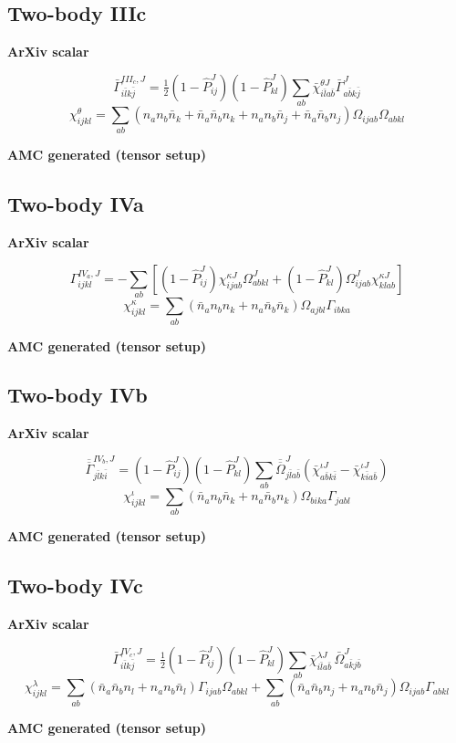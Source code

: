 \documentclass[11pt]{article}
\newcommand{\CompareBlock}[3]{%
\subsection*{#1}
\noindent
\begin{minipage}[t]{0.48\textwidth}
\textbf{ArXiv scalar}
#2
\end{minipage}\hfill
\begin{minipage}[t]{0.48\textwidth}
\textbf{AMC generated (tensor setup)}

\end{minipage}
\vspace{1em}
}
\begin{document}
\CompareBlock{Two-body IIIc}{
\begin{equation*}
\bar\Gamma^{III_c,J}_{i\bar l k\bar j}=\tfrac12(1-\hat P^J_{ij})(1-\hat P^J_{kl})\sum_{ab}\bar\chi^{\theta J}_{i\bar l a\bar b}\bar\Gamma^J_{a\bar b k\bar j}
\end{equation*}
\begin{equation*}
 \chi^{\theta}_{ijkl}=\sum_{ab}\left(n_a n_b\bar n_k+\bar n_a\bar n_b n_k+n_a n_b\bar n_j+\bar n_a\bar n_b n_j\right)\Omega_{ijab}\Omega_{abkl}
\end{equation*}
}{amc_eq_snippets_clean/dc_G3c_tensor_clean_body.tex}

\CompareBlock{Two-body IVa}{
\begin{equation*}
\Gamma^{IV_a,J}_{ijkl}=-\sum_{ab}\left[(1-\hat P^J_{ij})\chi^{\kappa J}_{ijab}\Omega^J_{abkl}+(1-\hat P^J_{kl})\Omega^J_{ijab}\chi^{\kappa J}_{klab}\right]
\end{equation*}
\begin{equation*}
 \chi^{\kappa}_{ijkl}=\sum_{ab}\left(\bar n_a n_b n_k+n_a\bar n_b\bar n_k\right)\Omega_{ajbl}\Gamma_{ibka}
\end{equation*}
}{amc_eq_snippets_clean/dc_G4a_tensor_clean_body.tex}

\CompareBlock{Two-body IVb}{
\begin{equation*}
\overline{\overline\Gamma}^{IV_b,J}_{j\bar l k\bar i}=(1-\hat P^J_{ij})(1-\hat P^J_{kl})\sum_{ab}\overline{\overline\Omega}^{J}_{j\bar l a\bar b}\left(\bar\chi^{\iota J}_{a\bar b k\bar i}-\bar\chi^{\iota J}_{k\bar i a\bar b}\right)
\end{equation*}
\begin{equation*}
 \chi^{\iota}_{ijkl}=\sum_{ab}\left(\bar n_a n_b\bar n_k+n_a\bar n_b n_k\right)\Omega_{bika}\Gamma_{jabl}
\end{equation*}
}{amc_eq_snippets_clean/dc_G4b_tensor_clean_body.tex}

\CompareBlock{Two-body IVc}{
\begin{equation*}
\bar\Gamma^{IV_c,J}_{i\bar l k\bar j}=\tfrac12(1-\hat P^J_{ij})(1-\hat P^J_{kl})\sum_{ab}\bar\chi^{\lambda J}_{i\bar l a\bar b}\,\bar\Omega^J_{a\bar k j\bar b}
\end{equation*}
\begin{equation*}
 \chi^{\lambda}_{ijkl}=\sum_{ab}\left(\bar n_a\bar n_b n_l+n_a n_b\bar n_l\right)\Gamma_{ijab}\Omega_{abkl}+\sum_{ab}\left(\bar n_a\bar n_b n_j+n_a n_b\bar n_j\right)\Omega_{ijab}\Gamma_{abkl}
\end{equation*}
}{amc_eq_snippets_clean/dc_G4c_tensor_clean_body.tex}
\end{document}
